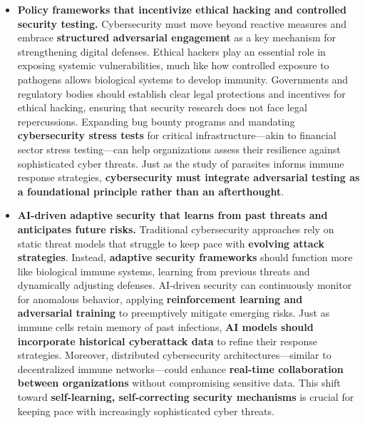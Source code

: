 \documentclass{article}
\begin{document}
\begin{itemize}
    \item \textbf{Policy frameworks that incentivize ethical hacking and controlled security testing.}  
    Cybersecurity must move beyond reactive measures and embrace \textbf{structured adversarial engagement} as a key mechanism for strengthening digital defenses. Ethical hackers play an essential role in exposing systemic vulnerabilities, much like how controlled exposure to pathogens allows biological systems to develop immunity. Governments and regulatory bodies should establish clear legal protections and incentives for ethical hacking, ensuring that security research does not face legal repercussions. Expanding bug bounty programs and mandating \textbf{cybersecurity stress tests} for critical infrastructure—akin to financial sector stress testing—can help organizations assess their resilience against sophisticated cyber threats. Just as the study of parasites informs immune response strategies, \textbf{cybersecurity must integrate adversarial testing as a foundational principle rather than an afterthought}.  

    \item \textbf{AI-driven adaptive security that learns from past threats and anticipates future risks.}  
    Traditional cybersecurity approaches rely on static threat models that struggle to keep pace with \textbf{evolving attack strategies}. Instead, \textbf{adaptive security frameworks} should function more like biological immune systems, learning from previous threats and dynamically adjusting defenses. AI-driven security can continuously monitor for anomalous behavior, applying \textbf{reinforcement learning and adversarial training} to preemptively mitigate emerging risks. Just as immune cells retain memory of past infections, \textbf{AI models should incorporate historical cyberattack data} to refine their response strategies. Moreover, distributed cybersecurity architectures—similar to decentralized immune networks—could enhance \textbf{real-time collaboration between organizations} without compromising sensitive data. This shift toward \textbf{self-learning, self-correcting security mechanisms} is crucial for keeping pace with increasingly sophisticated cyber threats.  


\end{itemize}
\end{document}
